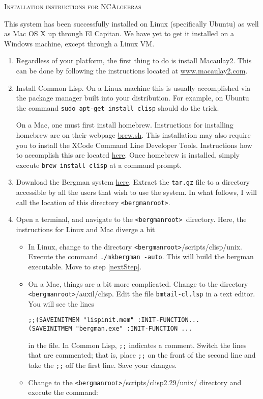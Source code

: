 \documentclass{article}
\newcommand{\bergroot}{\texttt{<bergmanroot>}}
\begin{document}
\begin{center}
\textsc{Installation instructions for NCAlgebras}
\end{center}

This system has been successfully installed on Linux (specifically Ubuntu)
as well as Mac OS X up through El Capitan.  We have yet to get it installed
on a Windows machine, except through a Linux VM.

\begin{enumerate}

\item Regardless of your platform, the first thing to do is install Macaulay2.
This can be done by following the instructions located at \url{www.macaulay2.com}.

\item Install Common Lisp.  On a Linux machine this is usually accomplished via
the package manager built into your distribution.  For example, on Ubuntu
the command \texttt{sudo apt-get install clisp} should do the trick.

On a Mac, one must first install homebrew.  Instructions for installing homebrew
are on their webpage \url{brew.sh}.  This installation may also require you to install
the XCode Command Line Developer Tools.  Instructions how to accomplish this are located
\href{http://osxdaily.com/2014/02/12/install-command-line-tools-mac-os-x/}{here}.
Once homebrew is installed, simply execute \texttt{brew install clisp} at a command prompt.

\item Download the Bergman system \href{http://servus.math.su.se/bergman/}{here}.
Extract the \texttt{tar.gz} file to a directory accessible by all the users that wish
to use the system.  In what follows, I will call the location of this directory \bergroot. 

\item Open a terminal, and navigate to the \bergroot~directory.  Here, the instructions
for Linux and Mac diverge a bit
\begin{itemize}
\item In Linux, change to the directory \bergroot/scripts/clisp/unix.  Execute the command
\texttt{./mkbergman -auto}.  This will build the bergman executable.  Move to step \ref{nextStep}.
\item On a Mac, things are a bit more complicated.  Change to the directory \bergroot/auxil/clisp.
Edit the file \texttt{bmtail-cl.lsp} in a text editor.  You will see the lines
\begin{verbatim}
;;(SAVEINITMEM "lispinit.mem" :INIT-FUNCTION...
(SAVEINITMEM "bergman.exe" :INIT-FUNCTION ...
\end{verbatim}
in the file.  In Common Lisp, \verb.;;. indicates a comment.  Switch the lines that are commented;
that is, place \verb.;;. on the front of the second line and take the \verb.;;. off the first line.
Save your changes.
\item Change to the \bergroot/scripts/clisp2.29/unix/ directory and execute the command:


\end{itemize}
\end{enumerate}
\end{document}
